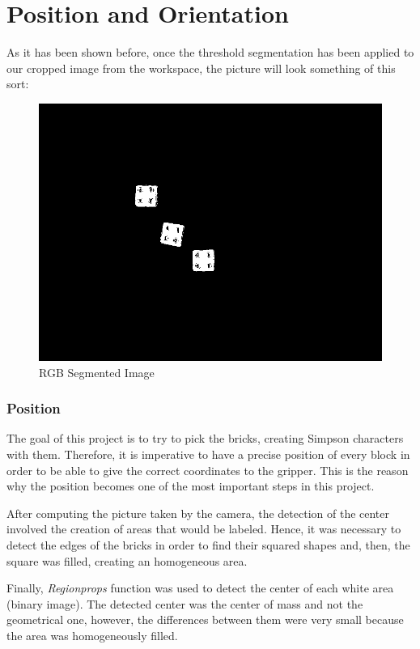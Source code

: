 \chapter{Position and Orientation}\label{ch:position_rotation}

As it has been shown before, once the threshold segmentation has been applied to our cropped image from the workspace, the picture will look something of this sort:

\begin{figure}[hb]
  \centering
  \includegraphics[scale=0.3]{figures/thresh_img.png}
  \caption[thresholded_image] {RGB Segmented Image}
\end{figure}

\subsection*{Position}
The goal of this project is to try to pick the bricks, creating Simpson characters with them. Therefore, it is imperative to have a precise position of every block in order to be able to give the correct coordinates to the gripper. This is the reason why the position becomes one of the most important steps in this project.

After computing the picture taken by the camera, the detection of the center involved the creation of areas that would be labeled. Hence, it was necessary to detect the edges of the bricks in order to find their squared shapes and, then, the square was filled, creating an homogeneous area.

Finally, \textit{Regionprops} function was used to detect the center of each white area (binary image). The detected center was the center of mass and not the geometrical one, however, the differences between them were very small because the area was homogeneously filled.



